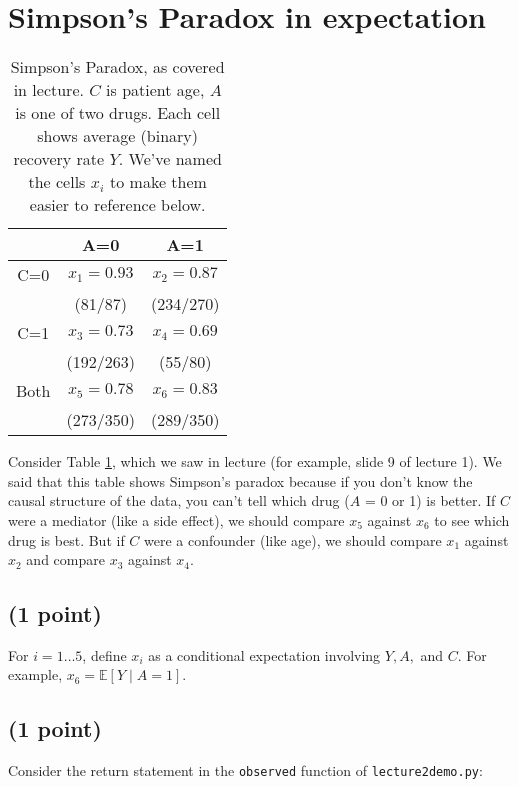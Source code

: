 \documentclass[12pt]{article}
\begin{document}
\clearpage

\section{Simpson's Paradox in expectation}

\begin{table}[!th]
\centering
\begin{tabular}{c c c}
& A=0 & A=1 \\
\midrule
C=0 & $x_1 = 0.93$ & $x_2 = 0.87$ \\
&     (81/87)        & (234/270) \\[0.5em]
C=1 & $x_3 = 0.73$ & $x_4 = 0.69$ \\
&     (192/263)      & (55/80) \\[0.5em]
Both & $x_5 = 0.78$ & $x_6 = 0.83$ \\
&     (273/350)      & (289/350) \\
\bottomrule
\end{tabular}
\caption{Simpson's Paradox, as covered in lecture. $C$ is patient age, $A$ is one of two drugs. Each cell shows average (binary) recovery rate $Y$. We've named the cells $x_i$ to make them easier to reference below.}
\label{tbl:simpsons}
\end{table}

Consider Table \ref{tbl:simpsons}, which we saw in lecture (for example, slide 9 of lecture 1).  We said that this table shows Simpson's paradox because if you don't know the causal structure of the data, you can't tell which drug ($A$ = 0 or 1) is better. If $C$ were a mediator (like a side effect), we should compare $x_5$ against $x_6$ to see which drug is best. But if $C$ were a confounder (like age), we should compare $x_1$ against $x_2$ and compare $x_3$ against $x_4$.


\subsection{(1 point)} \label{q1.1}

For $i = 1 \ldots 5$, define $x_i$ as a conditional expectation involving $Y, A,$ and $C$. For example, $x_6 = \mathbb{E}[Y \mid A=1]$.

\subsection{(1 point)}

Consider the return statement in the {\tt observed} function of {\tt lecture2demo.py}: 
\end{document}
